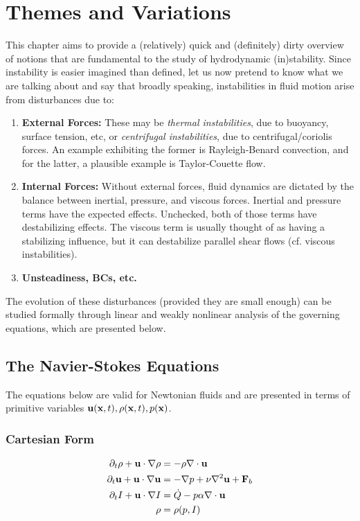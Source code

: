 \chapter{Themes and Variations}

This chapter aims to provide a (relatively) quick and (definitely) dirty overview of notions that are fundamental to the study of hydrodynamic (in)stability. Since instability is easier imagined than defined, let us now pretend to know what we are talking about and say that broadly speaking, instabilities in fluid motion arise from disturbances due to:
\begin{enumerate}
    \item \textbf{External Forces:} These may be \emph{thermal instabilities}, due to buoyancy, surface tension, etc, or \emph{centrifugal instabilities}, due to centrifugal/coriolis forces. An example exhibiting the former is Rayleigh-Benard convection, and for the latter, a plausible example is Taylor-Couette flow. 
        
    \item \textbf{Internal Forces:} Without external forces, fluid dynamics are dictated by the balance between inertial, pressure, and viscous forces. Inertial and pressure terms have the expected effects. Unchecked, both of those terms have destabilizing effects. The viscous term is usually thought of as having a stabilizing influence, but it can destabilize parallel shear flows (cf. viscous instabilities). 
    
    \item \textbf{Unsteadiness, BCs, etc.}
\end{enumerate}
The evolution of these disturbances (provided they are small enough) can be studied formally through linear and weakly nonlinear analysis of the governing equations, which are presented below. 

\section{The Navier-Stokes Equations}
The equations below are valid for Newtonian fluids and are presented in terms of primitive variables ${\textbf{u}}({\textbf{x}}, t), \rho({\textbf{x}}, t), p({\textbf{x}})$.
\subsection{Cartesian Form}
\begin{align*}
    \partial_t \rho + {\textbf{u}} \cdot \nabla \rho &= - \rho \nabla \cdot {\textbf{u}}\\
    \partial_t {\textbf{u}} + {\textbf{u}} \cdot \nabla {\textbf{u}} &= - \nabla p + \nu \nabla^2{\textbf{u}} + \textbf{F}_b\\
    \partial_t I + {\textbf{u}} \cdot \nabla I &= \Dot{Q} - p\alpha \nabla \cdot {\textbf{u}} \\
    \rho &= \rho(p, I)
\end{align*}


